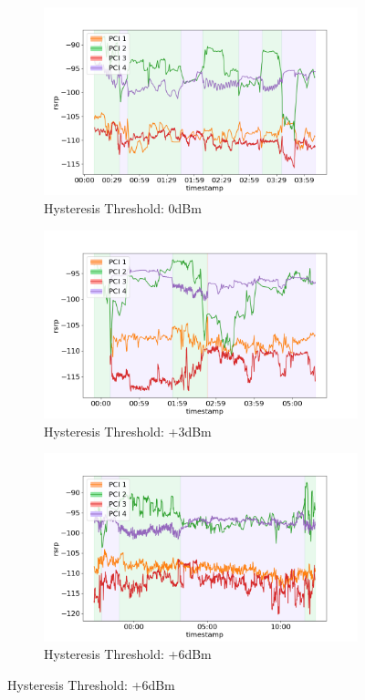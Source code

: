 \begin{figure}[p]
    \centering
    \caption{Hysteresis values effects on HO rate}
    \label{fig:methods:hysteresis}
    \begin{subfigure}{\linewidth}
        \centering
        \includegraphics[width=0.55\linewidth]{src//img/5hyst0.png}
        \caption{Hysteresis Threshold: 0dBm}
        \label{fig:methods:hyst0}
    \end{subfigure}
    
    \begin{subfigure}{.9\linewidth}
        \centering
        \includegraphics[width=0.6\linewidth]{src//img/5hyst3.png}
        \caption{Hysteresis Threshold: +3dBm}
        \label{fig:methods:hyst3}
    \end{subfigure}
    
    \begin{subfigure}{\linewidth}
        \centering
        \includegraphics[width=0.55\linewidth]{src//img/5hyst6.png}
        \caption{Hysteresis Threshold: +6dBm}
        \label{fig:methods:hyst6}
    \end{subfigure}
    

\end{figure}
